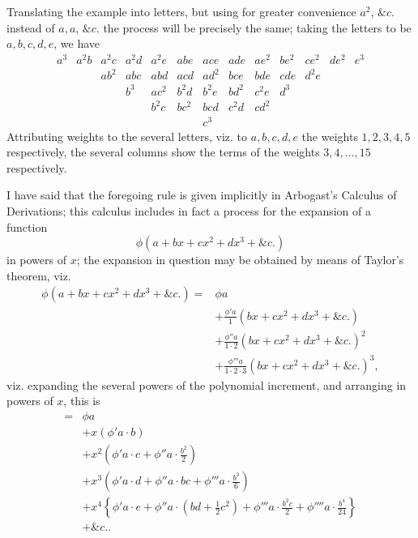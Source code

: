 \documentclass[11pt,a4paper]{article}
\theoremstyle{plain}
\theoremstyle{definition}
\newcommand{\amp}{\&c.}
\begin{document}
Translating the example into letters, but using for greater convenience \(a^{2}\), \(\amp\)
instead of \(a,a\), \(\amp\) the process will be precisely the same; taking the letters to be
\(a,b,c,d,e\), we have
\[
\begin{array}{lllllllllllll}
a^{3}&a^{2}b&a^{2}c&a^{2}d&a^{2}e&abe&ace&ade&ae^{2}&be^{2}&ce^{2}&de^{2}&e^{3}\\
     &      &ab^{2}&abc&abd&acd&ad^{2}&bce&bde&cde&d^{2}e&      &      \\
     &      &      &b^{3}&ac^{2}&b^{2}d&b^{2}e&bd^{2}&c^{2}e&d^{3}&      &      &      \\
     &      &      &     &b^{2}c&bc^{2}&bcd&c^{2}d&cd^{2}&      &      &      &      \\
     &      &      &     &      &      &c^{3}&      &      &      &      &      &
\end{array}
\]
Attributing weights to the several letters, viz. to \(a,b,c,d,e\) the weights \(1,2,3,4,5\)
respectively, the several columns show the terms of the weights \(3,4,\ldots,15\) respectively.

I have said that the foregoing rule is given implicitly in Arbogast's Calculus of Derivations;
this calculus includes in fact a process for the expansion of a function
\[
\phi(a+bx+cx^{2}+dx^{3}+\amp)
\]
in powers of \(x\); the expansion in question may be obtained by means of Taylor's theorem,
viz.
\[
\begin{aligned}
\phi(a+bx+cx^{2}+dx^{3}+\amp)
={}&\phi a\\
&+\frac{\phi'a}{1}(bx+cx^{2}+dx^{3}+\amp)\\
&+\frac{\phi''a}{1\cdot2}(bx+cx^{2}+dx^{3}+\amp)^{2}\\
&+\frac{\phi'''a}{1\cdot2\cdot3}(bx+cx^{2}+dx^{3}+\amp)^{3},
\end{aligned}
\]
viz. expanding the several powers of the polynomial increment, and arranging in powers of
\(x\), this is
\[
\begin{aligned}
={}&\phi a\\
&+x(\phi'a\cdot b)\\
&+x^{2}\left(\phi'a\cdot c+\phi''a\cdot\frac{b^{2}}{2}\right)\\
&+x^{3}\left(\phi'a\cdot d+\phi''a\cdot bc+\phi'''a\cdot\frac{b^{3}}{6}\right)\\
&+x^{4}\left\{\phi'a\cdot e+\phi''a\cdot\left(bd+\frac{1}{2}c^{2}\right)
+\phi'''a\cdot\frac{b^{2}c}{2}+\phi''''a\cdot\frac{b^{4}}{24}\right\}\\
&+\amp.
\end{aligned}
\]
\end{document}
